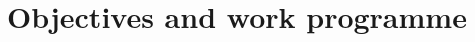 \documentclass[enabledeprecatedfontcommands,cleardoublepage=empty,headsepline,twoside,11pt,DIV=15,BCOR=12mm,final]{scrartcl}
\begin{document}
\section{Objectives and work programme} 
\label{sec:object}
\end{document}
